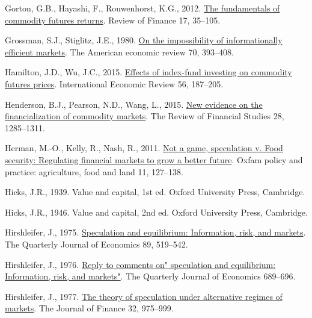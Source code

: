 \documentclass[]{elsarticle} %
\newlength{\cslhangindent}
\newlength{\cslentryspacingunit} %
\newenvironment{CSLReferences}[2] %
 {%
  \setlength{\parindent}{0pt}
  \ifodd #1
  \let\oldpar\par
  \def\par{\hangindent=\cslhangindent\oldpar}
  \fi
  \setlength{\parskip}{#2\cslentryspacingunit}
 }%
 {}
\begin{document}
\begin{CSLReferences}{1}{0}
\leavevmode{}%
Gorton, G.B., Hayashi, F., Rouwenhorst, K.G., 2012. \href{https://doi.org/10.1093/rof/rfs019}{The fundamentals of commodity futures returns}. Review of Finance 17, 35--105.

\leavevmode{}%
Grossman, S.J., Stiglitz, J.E., 1980. \href{https://doi.org/10.7916/D8765R99}{On the impossibility of informationally efficient markets}. The American economic review 70, 393--408.

\leavevmode{}%
Hamilton, J.D., Wu, J.C., 2015. \href{https://doi.org/10.1111/iere.12099}{Effects of index-fund investing on commodity futures prices}. International Economic Review 56, 187--205.

\leavevmode{}%
Henderson, B.J., Pearson, N.D., Wang, L., 2015. \href{https://doi.org/10.1093/rfs/hhu091}{New evidence on the financialization of commodity markets}. The Review of Financial Studies 28, 1285--1311.

\leavevmode{}%
Herman, M.-O., Kelly, R., Nash, R., 2011. \href{https://www.ingentaconnect.com/content/oxpp/oppafl/2011/00000011/00000007/art00005}{Not a game, speculation v. Food security: Regulating financial markets to grow a better future}. Oxfam policy and practice: agriculture, food and land 11, 127--138.

\leavevmode{}%
Hicks, J.R., 1939. Value and capital, 1st ed. Oxford University Press, Cambridge.

\leavevmode{}%
Hicks, J.R., 1946. Value and capital, 2nd ed. Oxford University Press, Cambridge.

\leavevmode{}%
Hirshleifer, J., 1975. \href{https://doi.org/10.2307/1884690}{Speculation and equilibrium: Information, risk, and markets}. The Quarterly Journal of Economics 89, 519--542.

\leavevmode{}%
Hirshleifer, J., 1976. \href{https://doi.org/10.2307/1885330}{Reply to comments on" speculation and equilibrium: Information, risk, and markets"}. The Quarterly Journal of Economics 689--696.

\leavevmode{}%
Hirshleifer, J., 1977. \href{https://doi.org/10.2307/2326507}{The theory of speculation under alternative regimes of markets}. The Journal of Finance 32, 975--999.


\end{CSLReferences}
\end{document}
